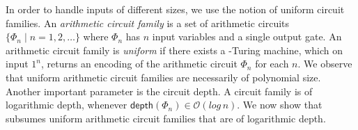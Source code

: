 
In order to handle inputs of different sizes, we use the notion of uniform circuit families. An \textit{arithmetic circuit family} is a set of arithmetic circuits $\{\Phi_n\mid n=1,2,\ldots\}$ where $\Phi_n$ has $n$ input variables and a single output gate. An arithmetic circuit family is \textit{uniform} if there exists a \logspace-Turing machine,
which on input $1^n$, returns an encoding of the arithmetic circuit $\Phi_n$ for each $n$.
We observe that uniform arithmetic circuit families are necessarily of polynomial size. %
Another important parameter is the circuit depth. A circuit family is of logarithmic depth, whenever $\mathsf{depth}(\Phi_n)\in \mathcal{O}(log\, n)$. We  now show that \langfor subsumes uniform arithmetic circuit families that are of logarithmic depth. 

